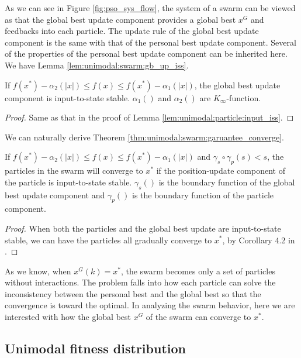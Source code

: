 As we can see in Figure \ref{fig:pso_sys_flow}, the system of a swarm can be viewed as that the global best update component provides a global best $ x^{G} $ and feedbacks into each particle.
The update rule of the global best update component is the same with that of the personal best update component.
Several of the properties of the personal best update component can be inherited here.
We have Lemma \ref{lem:unimodal:swarm:gb_up_iss}.

\begin{mylem}
\label{lem:unimodal:swarm:gb_up_iss}
If $ f(x^{*}) - \alpha_{2} ( |x| ) \leq  f(x) \leq f(x^{*}) - \alpha_{1} ( |x| ) $, the global best update component is input-to-state stable.
$ \alpha_{1} () $ and $ \alpha_{2} () $ are $ K_{\infty} $-function.
\begin{proof}
Same as that in the proof of Lemma \ref{lem:unimodal:particle:input_iss}.
\end{proof}
\end{mylem}

We can naturally derive Theorem \ref{thm:unimodal:swarm:garuantee_converge}.

\begin{mythm}
\label{thm:unimodal:swarm:garuantee_converge}
If $ f(x^{*}) - \alpha_{2} ( |x| ) \leq  f(x) \leq f(x^{*}) - \alpha_{1} ( |x| ) $ and $ \gamma_{s} \circ \gamma_{p} (s)  < s $, the particles in the swarm will converge to $ x^{*} $ if the position-update component of the particle is input-to-state stable.
$ \gamma_{s} () $ is the boundary function of the global best update component and $ \gamma_{p} () $ is the boundary function of the particle component.
\begin{proof}
When both the particles and the global best update are input-to-state stable, we can have the particles all gradually converge to $ x^{*} $, by Corollary 4.2 in \cite{Jiang2001857}.
\end{proof}
\end{mythm}

As we know, when $ x^{G}(k) = x^{*} $, the swarm becomes only a set of particles without interactions.
The problem falls into how each particle can solve the inconsistency between the personal best and the global best so that the convergence is toward the optimal.
In analyzing the swarm behavior, here we are interested with how the global best $ x^{G} $ of the swarm can converge to $ x^{*} $.

\subsection{Unimodal fitness distribution}

